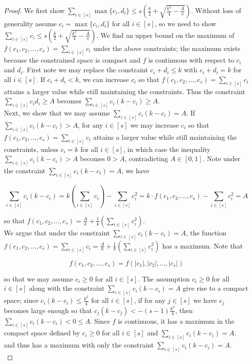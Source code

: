 \documentclass{article}
\begin{document}
\begin{proof}
We first show $\sum_{i \in [s]} \max\{c_i,d_i\} \leq s(\frac{k}{2} + \sqrt{\frac{k^2}{4}-\frac{A}{s}})$. Without loss of generality assume $c_i = \max\{c_i,d_i\}$ for all $i \in [s]$, so we need to show $\sum_{i \in [s]} c_i \leq s(\frac{k}{2} + \sqrt{\frac{k^2}{4}-\frac{A}{s}})$. We find an upper bound on the maximum of $f(c_1,c_2,\ldots,c_s) = \sum_{i \in [s]} c_i$ under the above constraints; the maximum exists because the constrained space is compact and $f$ is continuous with respect to $c_i$ and $d_i$. First note we may replace the constraint $c_i + d_i \leq k$ with $c_i + d_i = k$ for all $i \in [s]$. If $c_i+d_i < k$, we can increase $c_i$ so that $f(c_1,c_2,\ldots,c_s) = \sum_{i \in [s]} c_i$ attains a larger value while still maintaining the constraints. Thus the constraint $\sum_{i \in [s]} c_id_i \geq A$ becomes $\sum_{i \in [s]} c_i(k-c_i) \geq A$. \\

Next, we show that we may assume $\sum_{i \in [s]} c_i(k-c_i) = A$. If $\sum_{i \in [s]} c_i(k-c_i) > A$, for any $i \in [s]$ we may increase $c_i$ so that $f(c_1,c_2,\ldots,c_s) = \sum_{i \in [s]} c_i$ attains a larger value while still maintaining the constraints, unless $c_i = k$ for all $i \in [s]$, in which case the inequality $\sum_{i \in [s]} c_i(k-c_i) > A$ becomes $0 > A$, contradicting $A \in [0,1]$. Note under the constraint $\sum_{i \in [s]} c_i(k-c_i) = A$, we have

$$\sum_{i \in [s]} c_i(k-c_i) = k(\sum_{i \in [s]} c_i) - \sum_{i \in [s]} c_i^2 = k \cdot f(c_1,c_2,\ldots,c_s) - \sum_{i \in [s]} c_i^2 = A$$

\noindent
so that $f(c_1,c_2,\ldots,c_s) = \frac{A}{k} + \frac{1}{k}(\sum_{i \in [s]} c_i^2)$. \\

We argue that under the constraint $\sum_{i \in [s]} c_i(k-c_i) = A$, the function $f(c_1,c_2,\ldots,c_s) = \sum_{i \in [s]} c_i = \frac{A}{k} + \frac{1}{k}(\sum_{i \in [s]} c_i^2)$ has a maximum. Note that

$$f(c_1,c_2,\ldots,c_s) = f(|c_1|,|c_2|,\ldots,|c_s|)$$

\noindent
so that we may assume $c_i \geq 0$ for all $i \in [s]$. The assumption $c_i \geq 0$ for all $i \in [s]$ along with the constraint $\sum_{i \in [s]} c_i(k-c_i) = A$ give rise to a compact space; since $c_i(k-c_i) \leq \frac{k^2}{4}$ for all $i \in [s]$, if for any $j \in [s]$ we have $c_j$ becomes large enough so that $c_j(k-c_j) < -(s-1)\frac{k^2}{4}$, then $\sum_{i \in [s]} c_i(k-c_i) < 0 \leq A$. Since $f$ is continuous, it has a maximum in the compact space defined by $c_i \geq 0$ for all $i \in [s]$ and $\sum_{i \in [s]} c_i(k-c_i) = A$, and thus has a maximum with only the constraint $\sum_{i \in [s]} c_i(k-c_i) = A$. \\


\end{proof}
\end{document}
